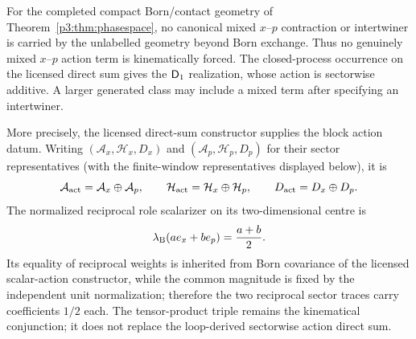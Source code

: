 \documentclass[12pt,a4paper]{article}
\begin{document}
\begin{theorem}
\label{p3:thm:sectorwise_additivity}
For the completed compact Born/contact geometry of
Theorem~\ref{p3:thm:phasespace}, no canonical mixed \(x\)--\(p\) contraction
or intertwiner is carried by the unlabelled geometry beyond Born exchange.
Thus no genuinely mixed \(x\)--\(p\) action term is kinematically forced.
The closed-process occurrence on the licensed direct sum gives the
\(\mathsf{D}_1\) realization, whose action is sectorwise additive.  A larger generated
class may include a mixed term after specifying an intertwiner.

More precisely, the licensed direct-sum constructor supplies the block action
datum.  Writing
\((\mathcal A_x,\mathcal H_x,D_x)\) and
\((\mathcal A_p,\mathcal H_p,D_p)\) for their sector representatives (with
the finite-window representatives displayed below), it is
\begin{equation}
 \mathcal A_{\rm act}=\mathcal A_x\oplus\mathcal A_p,
 \qquad
 \mathcal H_{\rm act}=\mathcal H_x\oplus\mathcal H_p,
 \qquad
 D_{\rm act}=D_x\oplus D_p.
 \label{p3:eq:primitive-reciprocal-action-coproduct}
\end{equation}
The normalized reciprocal role scalarizer on its two-dimensional centre is
\begin{equation}
       \lambda_{\rm B}(ae_x+be_p)=\frac{a+b}{2}.
       \label{p3:eq:born-central-state}
\end{equation}
Its equality of reciprocal weights is inherited from Born covariance of the licensed scalar-action constructor, while the common magnitude is fixed by the independent unit normalization; therefore the two reciprocal sector traces carry coefficients \(1/2\) each.
The tensor-product triple remains the kinematical conjunction; it does not
replace the loop-derived sectorwise action direct sum.
\end{theorem}
\end{document}

